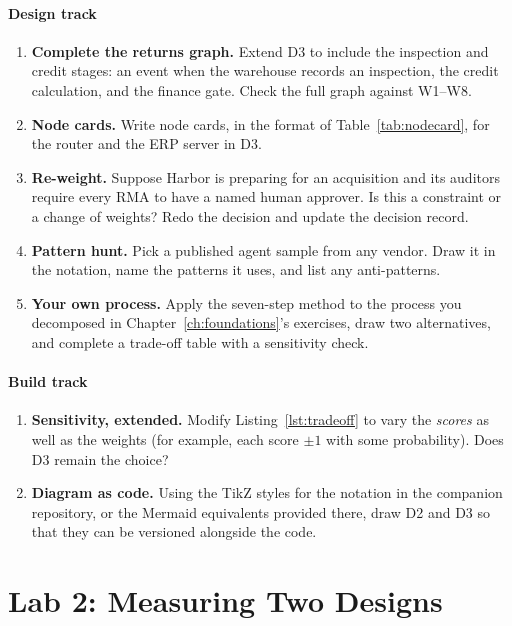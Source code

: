 \paragraph{Design track}
\begin{enumerate}[itemsep=2pt]
  \item \textbf{Complete the returns graph.} Extend D3 to include the inspection and credit stages: an event when the warehouse records an inspection, the credit calculation, and the finance gate. Check the full graph against W1--W8.
  \item \textbf{Node cards.} Write node cards, in the format of Table~\ref{tab:nodecard}, for the router and the ERP server in D3.
  \item \textbf{Re-weight.} Suppose Harbor is preparing for an acquisition and its auditors require every RMA to have a named human approver. Is this a constraint or a change of weights? Redo the decision and update the decision record.
  \item \textbf{Pattern hunt.} Pick a published agent sample from any vendor. Draw it in the notation, name the patterns it uses, and list any anti-patterns.
  \item \textbf{Your own process.} Apply the seven-step method to the process you decomposed in Chapter~\ref{ch:foundations}'s exercises, draw two alternatives, and complete a trade-off table with a sensitivity check.
\end{enumerate}

\paragraph{Build track}
\begin{enumerate}[resume, itemsep=2pt]
  \item \textbf{Sensitivity, extended.} Modify Listing~\ref{lst:tradeoff} to vary the \emph{scores} as well as the weights (for example, each score $\pm1$ with some probability). Does D3 remain the choice?
  \item \textbf{Diagram as code.} Using the TikZ styles for the notation in the companion repository, or the Mermaid equivalents provided there, draw D2 and D3 so that they can be versioned alongside the code.
\end{enumerate}

\section*{Lab 2: Measuring Two Designs}

